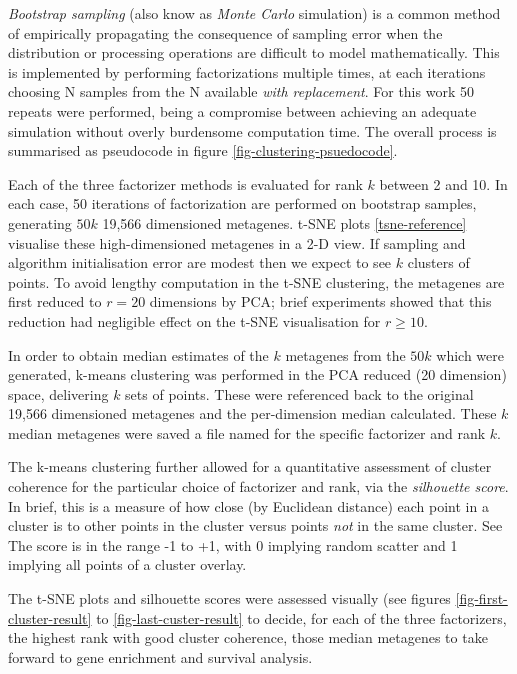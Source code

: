 \documentclass[tikz, 12pt,a4paper,oneside,fleqn]{article}
\begin{document}
\emph{Bootstrap sampling} (also know as \emph{Monte Carlo} simulation) is a common method of empirically propagating the consequence of sampling error when the distribution or processing operations are difficult to model mathematically.   This is implemented by performing factorizations multiple times, at each iterations choosing N samples from the N available \emph{with replacement}.   For this work 50 repeats were performed, being a compromise between achieving an adequate simulation without overly burdensome computation time.  The overall process is summarised as pseudocode in figure \ref{fig-clustering-psuedocode}.  

Each of the three factorizer methods is evaluated for rank $k$ between 2 and 10.  In each case, 50 iterations of factorization are performed on bootstrap samples, generating $50 k$ 19,566 dimensioned metagenes.   t-SNE plots \ref{tsne-reference} visualise these high-dimensioned metagenes in a 2-D view.   If sampling and algorithm initialisation error are modest then we expect to see $k$ clusters of points.   To avoid lengthy computation in the t-SNE clustering, the metagenes are first reduced to $r=20$ dimensions by PCA; brief experiments showed that this reduction had negligible effect on the t-SNE visualisation for $r \geq 10$.

In order to obtain median estimates of the $k$ metagenes from the $50 k$ which were generated, k-means clustering was performed in the PCA reduced (20 dimension) space, delivering $k$ sets of points.  These were referenced back to the original 19,566 dimensioned metagenes and the per-dimension median calculated.  These $k$ median metagenes were saved a file named for the specific factorizer and rank $k$.  

The k-means clustering further allowed for a quantitative assessment of cluster coherence for the particular choice of factorizer and rank, via the \emph{silhouette score}.  In brief, this is a measure of how close (by Euclidean distance) each point in a cluster is to other points in the cluster versus points \emph{not} in the same cluster.  See 
The score is in the range -1 to +1, with 0 implying random scatter and 1 implying all points of a cluster overlay.

The t-SNE plots and silhouette scores were assessed visually (see figures \ref{fig-first-cluster-result} to \ref{fig-last-custer-result} to decide, for each of the three factorizers, the highest rank with good cluster coherence, those median metagenes to take forward to gene enrichment and survival analysis.  
\end{document}
